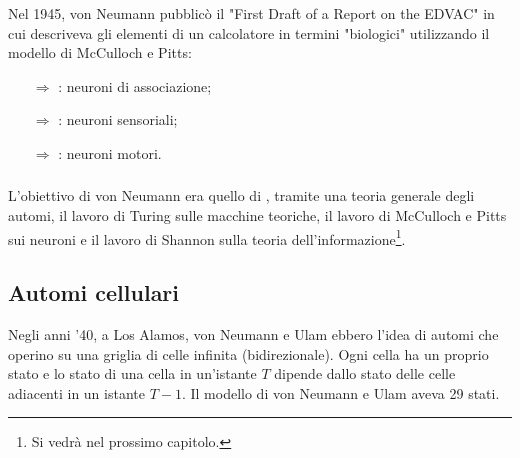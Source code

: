 \subsubsection{}

Nel 1945, von Neumann pubblicò il "First Draft of a Report on the EDVAC" in cui
descriveva gli elementi di un calcolatore in termini "biologici" utilizzando
il modello di McCulloch e Pitts:

\begin{itemize}
    \item [$\Rightarrow$] : neuroni di associazione;
    \item [$\Rightarrow$] : neuroni sensoriali;
    \item [$\Rightarrow$] : neuroni motori.
\end{itemize}

\subsubsection{}

L'obiettivo di von Neumann era quello di , tramite una
teoria generale degli automi, il lavoro di Turing sulle macchine teoriche,
il lavoro di McCulloch e Pitts sui neuroni e il lavoro di Shannon sulla
teoria dell'informazione\footnote{Si vedrà nel prossimo capitolo.}.


\subsection{Automi cellulari}

Negli anni '40, a Los Alamos, von Neumann e Ulam ebbero l'idea di
automi che operino su una griglia di celle infinita (bidirezionale).
Ogni cella ha un proprio stato e lo stato di una cella in un'istante $T$
dipende dallo stato delle celle adiacenti in un istante $T - 1$. Il modello
di von Neumann e Ulam aveva 29 stati.


